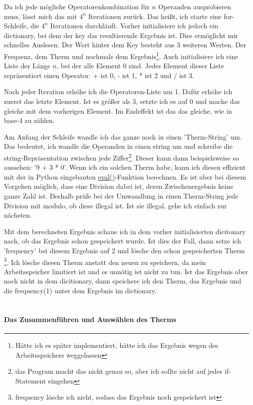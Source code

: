 \documentclass[a4paper,10pt,ngerman]{scrartcl}
\begin{document}
Da ich jede mögliche Operatorenkombination für $n$ Operanden ausprobieren muss, lässt mich das mit $4^{n}$ Iterationen zurück. Das heißt, ich starte eine for-Schleife, die $4^{n}$ Iterationen durchläuft. Vorher initialisiere ich jedoch ein dictionary, bei dem der key das resultierende Ergebnis ist. Dies ermöglicht mir schnelles Auslesen. Der Wert hinter dem Key besteht aus 3 weiteren Werten. Der Frequenz, dem Therm und nochmals dem Ergebnis\footnote{Hätte ich es später implementiert, hätte ich das Ergebnis wegen des Arbeitsspeichers weggelassen}. Auch initialisiere ich eine Liste der Länge $n$, bei der alle Element 0 sind. Jedes Element dieser Liste repräsentiert einen Operator. + ist 0, - ist 1, * ist 2 und / ist 3.

Nach jeder Iteration erhöhe ich die Operatoren-Liste um 1. Dafür erhöhe ich zuerst das letzte Element. Ist es größer als 3, setzte ich es auf 0 und mache das gleiche mit dem vorherigen Element. Im Endeffekt ist das das gleiche, wie in base-4 zu zählen.

Am Anfang der Schleife wandle ich das ganze noch in einen 'Therm-String' um. Das bedeutet, ich wandle die Operanden in einen string um und schreibe die string-Repräsentation zwischen jede Ziffer\footnote{das Program macht das nicht genau so, aber ich sollte nicht auf jedes if-Statement eingehen}. Dieser kann dann beispielsweise so aussehen: '9 + 3 * 0'. Wenn ich ein solchen Therm habe, kann ich diesen effizient mit der in Python eingebauten \href{https://www.w3schools.com/python/ref_func_eval.asp}{eval()}-Funktion berechnen. Es ist aber bei diesem Vorgehen möglich, dass eine Division dabei ist, deren Zwischenergebnis keine ganze Zahl ist. Deshalb prüfe bei der Umwandlung in einen Therm-String jede Division mit modulo, ob diese illegal ist. Ist sie illegal, gehe ich einfach zur nächsten.

Mit dem berechneten Ergebnis schaue ich in dem vorher initialisierten dicitonary nach, ob das Ergebnis schon gespeichert wurde. Ist dies der Fall, dann setze ich 'frequency' bei diesem Ergebnis auf 2 und lösche den schon gespeicherten Therm \footnote{frequency lösche ich nicht, sodass das Ergebnis noch gespeichert ist}. Ich lösche diesen Therm anstatt den neuen zu speichern, da mein Arbeitsspeicher limitiert ist und es unnötig ist nicht zu tun. Ist das Ergebnis aber noch nicht in dem dicitionary, dann speichere ich den Therm, das Ergebnis und die frequency(1) unter dem Ergebnis im dictionary.
\\
\\
\paragraph{Das Zusammenführen und Auswählen des Therms}
\end{document}

